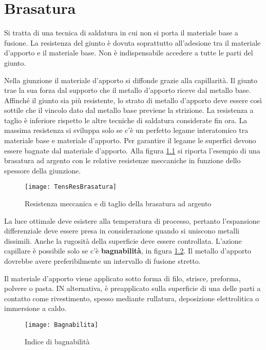 \chapter{Brasatura}
Si tratta di una tecnica di saldatura in cui non si porta il materiale base a fusione. La resistenza del giunto è dovuta soprattutto all'adesione tra il materiale d'apporto e il materiale base.
Non è indispensabile accedere a tutte le parti del giunto.

Nella giunzione il materiale d'apporto si diffonde grazie alla capillarità.
Il giunto trae la sua forza dal supporto che il metallo d'apporto riceve dal metallo base.
Affinché il giunto sia più resistente, lo strato di metallo d'apporto deve essere così sottile che il vincolo dato dal metallo base previene la strizione.
La resistenza a taglio è inferiore rispetto le altre tecniche di saldatura considerate fin ora.
La massima resistenza si sviluppa solo se c'è un perfetto legame interatomico tra materiale base e materiale d'apporto.
Per garantire il legame le superfici devono essere bagnate dal materiale d'apporto.
Alla figura \ref{fig:TensResBrasatura} si riporta l'esempio di una brasatura ad argento con le relative resistenze meccaniche in funzione dello spessore della giunzione.

\begin{figure}
\centering
\texttt{[image: TensResBrasatura]}
\caption{Resistenza meccanica e di taglio della brasatura ad argento}
\label{fig:TensResBrasatura}
\end{figure}

La luce ottimale deve esistere alla temperatura di processo, pertanto l'espansione differenziale deve essere presa in considerazione quando si uniscono metalli dissimili.
Anche la rugosità della superficie deve essere controllata.
L'azione capillare è possibile solo se c'è \textbf{bagnabilità}, in figura \ref{fig:Bagnabilita}.
Il metallo d'apporto dovrebbe avere preferibilmente un intervallo di fusione stretto.

Il materiale d'apporto viene applicato sotto forma di filo, strisce, preforma, polvere o pasta.
IN alternativa, è preapplicato sulla superficie di una delle parti a contatto come rivestimento, spesso mediante rullatura, deposizione elettrolitica o immersione a caldo.

\begin{figure}
\centering
\texttt{[image: Bagnabilita]}
\caption{Indice di bagnabilità}
\label{fig:Bagnabilita}
\end{figure}

